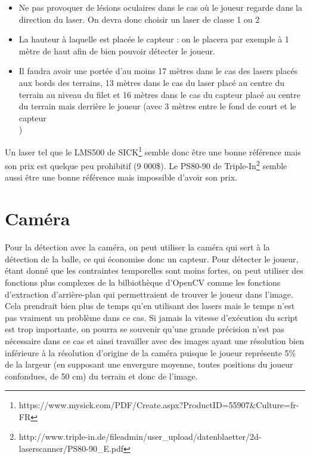 \begin{itemize}
\item Ne pas provoquer de lésions oculaires dans le cas où le joueur regarde dans la direction du laser. On devra donc choisir un laser de classe 1 ou 2
\item La hauteur à laquelle est placée le capteur : on le placera par exemple à 1 mètre de haut afin de bien pouvoir détecter le joueur. 
\item Il faudra avoir une portée d'au moins 17 mètres dans le cas des lasers placés aux bords des terrains, 13 mètres dans le cas du laser placé au centre du terrain au niveau du filet et 16 mètres dans le cas du capteur placé au centre du terrain mais derrière le joueur (avec 3 mètres entre le fond de court et le capteur\\)
\end{itemize}

Un laser tel que le LMS500 de SICK\footnote{https://www.mysick.com/PDF/Create.aspx?ProductID=55907\&Culture=fr-FR} semble donc être une bonne référence mais son prix est quelque peu prohibitif (9 000\$). Le PS80-90 de Triple-In\footnote{http://www.triple-in.de/fileadmin/user\_upload/datenblaetter/2d-laserscanner/PS80-90\_E.pdf} semble aussi être une bonne référence mais impossible d'avoir son prix. 


\section{Caméra}

Pour la détection avec la caméra, on peut utiliser la caméra qui sert à la détection de la balle, ce qui économise donc un capteur. Pour détecter le joueur, étant donné que les contraintes temporelles sont moins fortes, on peut utiliser des fonctions plus complexes de la bilbiothèque d'OpenCV comme les fonctions d'extraction d'arrière-plan qui permettraient de trouver le joueur dans l'image. Cela prendrait bien plus de temps qu'en utilisant des lasers mais le temps n'est pas vraiment un problème dans ce cas. Si jamais la vitesse d'exécution du script est trop importante, on pourra se souvenir qu'une grande précision n'est pas nécessaire dans ce cas et ainsi travailler avec des images ayant une résolution bien inférieure à la résolution d'origine de la caméra puisque le joueur représente 5\% de la largeur (en supposant une envergure moyenne, toutes positions du joueur confondues, de 50 cm) du terrain et donc de l'image. \\ 



